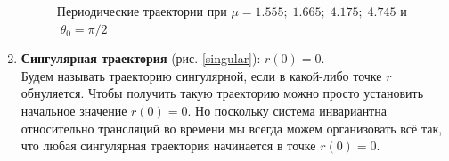 \documentclass[12pt]{article}
\numberwithin{equation}{section}
\begin{document}
\begin{enumerate}
\begin{figure}[h]
{		}
		\caption{Периодические траектории при $\mu=1.555;\;1.665;\;4.175;\;4.745$ и $\; \theta_{0}=\pi/2 $}
        \label{periodic}
	\end{figure}
	\clearpage
	\item \textbf{Сингулярная траектория} (рис. \ref{singular}): $ r(0)=0. $\\
	Будем называть траекторию сингулярной, если в какой-либо точке $ r $ обнуляется. Чтобы получить такую траекторию можно просто установить начальное значение $ r(0) = 0 $. Но поскольку система инвариантна относительно трансляций во времени мы всегда можем организовать всё так, что любая сингулярная траектория начинается в точке $ r(0) = 0 $.
	\vspace{2em}
	\begin{figure}[h]
\end{figure}
\end{enumerate}
\end{document}
